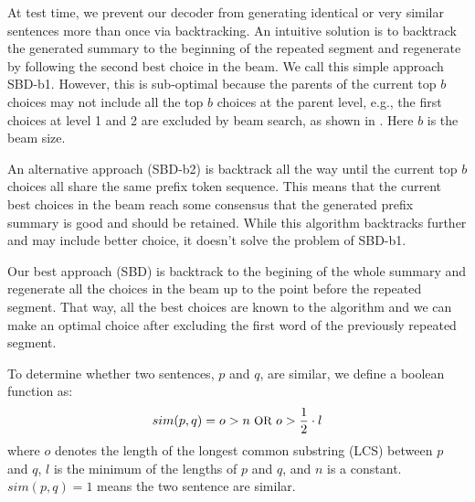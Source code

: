 At test time, we prevent our decoder from generating identical or
very similar sentences more than once via backtracking. 
An intuitive solution is to backtrack the generated summary to the beginning
of the repeated segment and regenerate by following the second best choice
in the beam. We call this simple approach SBD-b1.
However, this is sub-optimal because the parents of the current top $b$
choices may not include all the top $b$ choices at the parent level, e.g.,
the first choices at level 1 and 2 are excluded by beam search,
as shown in . Here $b$ is the beam size.

An alternative approach (SBD-b2) is backtrack all the way until the current
top $b$ choices all share the same prefix token sequence. This means
that the current best choices in the beam reach some consensus that
the generated prefix summary is good and should be retained. While
this algorithm backtracks further and may include better choice,
it doesn't solve the problem of SBD-b1.

Our best approach (SBD) is backtrack to the begining of the whole summary
and regenerate all the choices in the beam up to the point before
the repeated segment. That way, all the best choices are known to the
algorithm and we can make an optimal choice after excluding the first word
of the previously repeated segment. 

To determine whether two sentences, 
$p$ and $q$, are similar, we define a boolean function as:
\begin{equation}\label{eq:s}
\small
    sim(p,q) = o > n\text{ OR }o > \frac{1}{2}\cdot l
\end{equation}
where $o$ denotes the length of the longest common substring (LCS) between $p$ and $q$, 
$l$ is the minimum of the lengths of $p$ and $q$, and $n$ is a constant. 
$sim(p,q)=1$ means the two sentence are similar.

